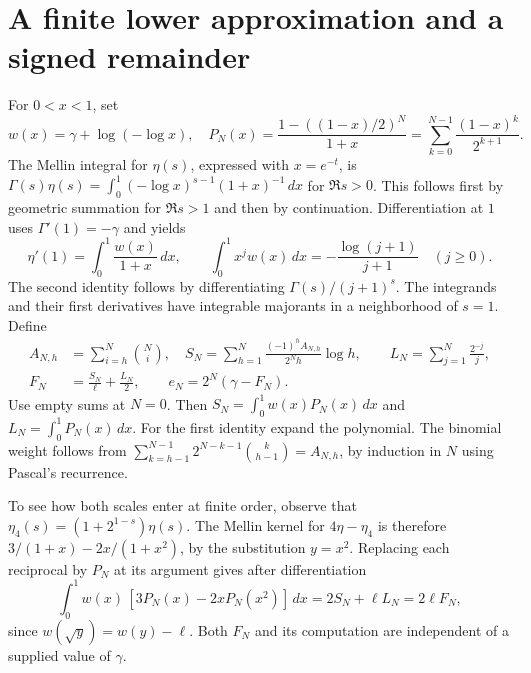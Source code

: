 \documentclass[11pt,a4paper,oneside,openany]{report}
\theoremstyle{remark}\newtheorem{remark}[theorem]{Remark}
\numberwithin{equation}{section}
\begin{document}
\section{A finite lower approximation and a signed remainder}
For $0<x<1$, set
\[
 w(x)=\gamma+\log(-\log x),\quad
 P_N(x)=\frac{1-((1-x)/2)^N}{1+x}
 =\sum_{k=0}^{N-1}\frac{(1-x)^k}{2^{k+1}} .
\]
The Mellin integral for $\eta(s)$, expressed with $x=e^{-t}$, is
$\Gamma(s)\eta(s)=\int_0^1(-\log x)^{s-1}(1+x)^{-1}\,dx$ for $\Re s>0$.
This follows first by geometric summation for $\Re s>1$ and then by continuation. Differentiation at $1$ uses $\Gamma'(1)=-\gamma$ and yields
\[
 \eta'(1)=\int_0^1\frac{w(x)}{1+x}\,dx,\qquad
 \int_0^1x^j w(x)\,dx=-\frac{\log(j+1)}{j+1}\quad(j\ge0).
\]
The second identity follows by differentiating $\Gamma(s)/(j+1)^s$. The integrands and their first derivatives have integrable majorants in a neighborhood of $s=1$. Define
\begin{align}
 A_{N,h}&=\sum_{i=h}^{N}\binom Ni,\quad
 S_N=\sum_{h=1}^N\frac{(-1)^h A_{N,h}}{2^N h}\log h,\qquad
 L_N=\sum_{j=1}^N\frac{2^{-j}}{j},\nonumber\\[-2pt]
 F_N&=\frac{S_N}{\ell}+\frac{L_N}{2},\qquad e_N=2^N(\gamma-F_N).\label{ch2:st:F}
\end{align}
Use empty sums at $N=0$. Then $S_N=\int_0^1w(x)P_N(x)\,dx$ and $L_N=\int_0^1P_N(x)\,dx$. For the first identity expand the polynomial. The binomial weight follows from
$\sum_{k=h-1}^{N-1}2^{N-k-1}\binom{k}{h-1}=A_{N,h}$, by induction in $N$ using Pascal's recurrence.

To see how both scales enter at finite order, observe that $\eta_4(s)=(1+2^{1-s})\eta(s)$. The Mellin kernel for $4\eta-\eta_4$ is therefore $3/(1+x)-2x/(1+x^2)$, by the substitution $y=x^2$. Replacing each reciprocal by $P_N$ at its argument gives after differentiation
\[
 \int_0^1 w(x)\,[3P_N(x)-2xP_N(x^2)]\,dx=2S_N+\ell L_N=2\ell F_N ,
\]
since $w(\sqrt y)=w(y)-\ell$. Both $F_N$ and its computation are independent of a supplied value of $\gamma$.
\end{document}
